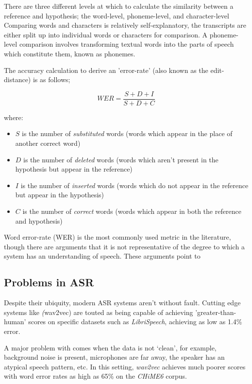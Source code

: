 There are three different levels at which to calculate the similarity between a reference and hypothesis; the word-level, phoneme-level, and character-level\cite{fang2020}
Comparing words and characters is relatively self-explanatory, the transcripts are either split up into individual words or characters for comparison.
A phoneme-level comparison involves transforming textual words into the parts of speech which constitute them, known as phonemes.

The accuracy calculation to derive an 'error-rate' (also known as the edit-distance\cite{niessen2000evaluation}) is as follows;

\[WER = \frac{S + D + I}{S + D + C}\]

where:

\begin{itemize}
  \item $S$ is the number of \emph{substituted} words (words which appear in the place of another correct word)
  \item $D$ is the number of \emph{deleted} words (words which aren't present in the hypothesis but appear in the reference)
  \item $I$ is the number of \emph{inserted} words (words which do not appear in the reference but appear in the hypothesis)
  \item $C$ is the number of \emph{correct} words (words which appear in both the reference and hypothesis)
\end{itemize}

Word error-rate (WER) is the most commonly used metric in the literature\cite{park2008empirical}, though there are arguments that it is not representative of the degree to which a system has an understanding of speech.
These arguments point to %

\subsection{Problems in ASR}

Despite their ubiquity, modern ASR systems aren't without fault.
Cutting edge systems like \emph(wav2vec) are touted as being capable of achieving 'greater-than-human' scores on specific datasets\cite{wav2vec2,bigssl,chung2021} such as \emph{LibriSpeech}\cite{librispeech}, achieving as low as 1.4\% error\cite{zhang2020}.

A major problem with comes when the data is not `clean', for example, background noise is present, microphones are far away, the speaker has an atypical speech pattern, etc. 
In this setting, \emph{wav2vec} achieves much poorer scores with word error rates as high as 65\%\cite{whisper} on the \emph{CHiME6} corpus\cite{chime6}.

